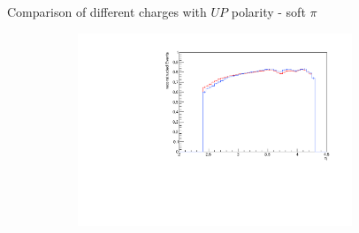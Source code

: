 \documentclass[11pt]{beamer}
\begin{document}
\begin{frame}{Comparison of different charges with $UP$ polarity - soft $\pi$}
\begin{figure}
\begin{subfigure}{0.45\textwidth}
\end{subfigure}
\begin{subfigure}{0.45\textwidth}
\includegraphics[width=0.9\textwidth]{first/up_pdf/combined/h_eta_reco_SPi.pdf}
\end{subfigure}
\end{figure}
\end{frame}
\end{document}
